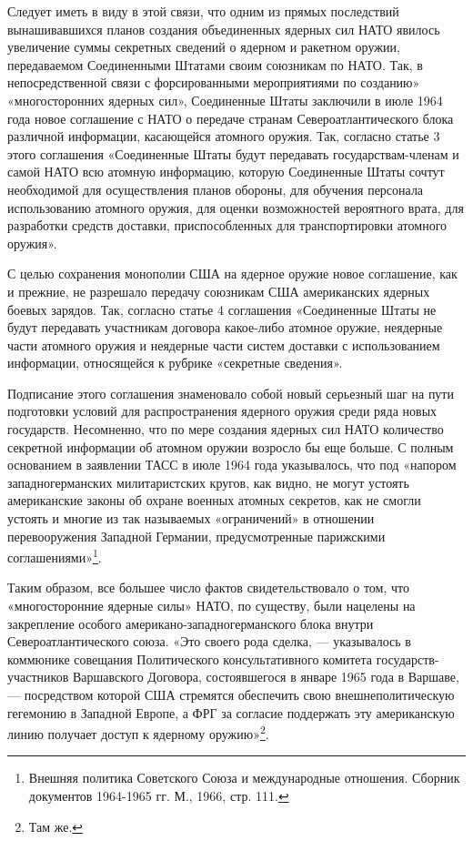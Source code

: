 \documentclass[12pt, a4paper, openany]{book}
\begin{document}
	Следует иметь в виду в этой связи, что одним из прямых последствий вынашивавшихся планов создания объединенных ядерных сил НАТО явилось увеличение суммы секретных сведений о ядерном и ракетном оружии, передаваемом Соединенными Штатами своим союзникам по НАТО. Так, в непосредственной связи с форсированными мероприятиями по созданию» «многосторонних ядерных сил», Соединенные Штаты заключили в июле 1964 года новое соглашение с НАТО о передаче странам Североатлантического блока различной информации, касающейся атомного оружия. Так, согласно статье 3 этого соглашения «Соединенные Штаты будут передавать государствам-членам и самой НАТО всю атомную информацию, которую Соединенные Штаты сочтут необходимой для осуществления планов обороны, для обучения персонала использованию атомного оружия, для оценки возможностей вероятного врата, для разработки средств доставки, приспособленных для транспортировки атомного оружия».
	
	С целью сохранения монополии США на ядерное оружие новое соглашение, как и прежние, не разрешало передачу союзникам США американских ядерных боевых зарядов. Так, согласно статье 4 соглашения «Соединенные Штаты не будут передавать участникам договора какое-либо атомное оружие, неядерные части атомного оружия и неядерные части систем доставки с использованием информации, относящейся к рубрике «секретные сведения».
	
	Подписание этого соглашения знаменовало собой новый серьезный шаг на пути подготовки условий для распространения ядерного оружия среди ряда новых государств. Несомненно, что по мере создания ядерных сил НАТО количество секретной информации об атомном оружии возросло бы еще больше. С полным основанием в заявлении ТАСС в июле 1964 года указывалось, что под «напором западногерманских милитаристских кругов, как видно, не могут устоять американские законы об охране военных атомных секретов, как не смогли устоять и многие из так называемых «ограничений» в отношении перевооружения Западной Германии, предусмотренные парижскими соглашениями»{\footnote{Внешняя политика Советского Союза и международные отношения. Сборник документов 1964-1965 гг. М., 1966, стр. 111.}}.
	
	Таким образом, все большее число фактов свидетельствовало о том, что «многосторонние ядерные силы» НАТО, по существу, были нацелены на закрепление особого американо-западногерманского блока внутри Североатлантического союза. «Это своего рода сделка, — указывалось в коммюнике совещания Политического консультативного комитета государств-участников Варшавского Договора, состоявшегося в январе 1965 года в Варшаве, — посредством которой США стремятся обеспечить свою внешнеполитическую гегемонию в Западной Европе, а ФРГ за согласие поддержать эту американскую линию получает доступ к ядерному оружию»{\footnote{Там же.}}.
	
\end{document}
